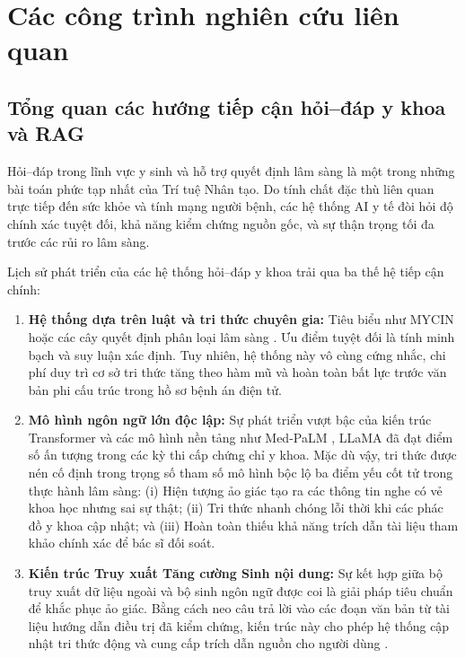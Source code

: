 \chapter{Các công trình nghiên cứu liên quan}

\section{Tổng quan các hướng tiếp cận hỏi--đáp y khoa và RAG}
Hỏi--đáp trong lĩnh vực y sinh và hỗ trợ quyết định lâm sàng là một trong những bài toán phức tạp nhất của Trí tuệ Nhân tạo. Do tính chất đặc thù liên quan trực tiếp đến sức khỏe và tính mạng người bệnh, các hệ thống AI y tế đòi hỏi độ chính xác tuyệt đối, khả năng kiểm chứng nguồn gốc, và sự thận trọng tối đa trước các rủi ro lâm sàng.

Lịch sử phát triển của các hệ thống hỏi--đáp y khoa trải qua ba thế hệ tiếp cận chính:
\begin{enumerate}[label=(\arabic*)]
    \item \textbf{Hệ thống dựa trên luật và tri thức chuyên gia:} Tiêu biểu như MYCIN \cite{rule_based_1} hoặc các cây quyết định phân loại lâm sàng \cite{rule_based_2}. Ưu điểm tuyệt đối là tính minh bạch và suy luận xác định. Tuy nhiên, hệ thống này vô cùng cứng nhắc, chi phí duy trì cơ sở tri thức tăng theo hàm mũ và hoàn toàn bất lực trước văn bản phi cấu trúc trong hồ sơ bệnh án điện tử.
    \item \textbf{Mô hình ngôn ngữ lớn độc lập:} Sự phát triển vượt bậc của kiến trúc Transformer \cite{vaswani2017} và các mô hình nền tảng như Med-PaLM \cite{singhal2023medpalm}, LLaMA \cite{touvron2023llama} đã đạt điểm số ấn tượng trong các kỳ thi cấp chứng chỉ y khoa. Mặc dù vậy, tri thức được nén cố định trong trọng số tham số mô hình bộc lộ ba điểm yếu cốt tử trong thực hành lâm sàng: (i) Hiện tượng ảo giác tạo ra các thông tin nghe có vẻ khoa học nhưng sai sự thật; (ii) Tri thức nhanh chóng lỗi thời khi các phác đồ y khoa cập nhật; và (iii) Hoàn toàn thiếu khả năng trích dẫn tài liệu tham khảo chính xác để bác sĩ đối soát.
    \item \textbf{Kiến trúc Truy xuất Tăng cường Sinh nội dung:} Sự kết hợp giữa bộ truy xuất dữ liệu ngoài và bộ sinh ngôn ngữ \cite{lewis2020, karpukhin2020} được coi là giải pháp tiêu chuẩn để khắc phục ảo giác. Bằng cách neo câu trả lời vào các đoạn văn bản từ tài liệu hướng dẫn điều trị đã kiểm chứng, kiến trúc này cho phép hệ thống cập nhật tri thức động và cung cấp trích dẫn nguồn cho người dùng \cite{gao2023, cheng2025knowledge}.
\end{enumerate}

